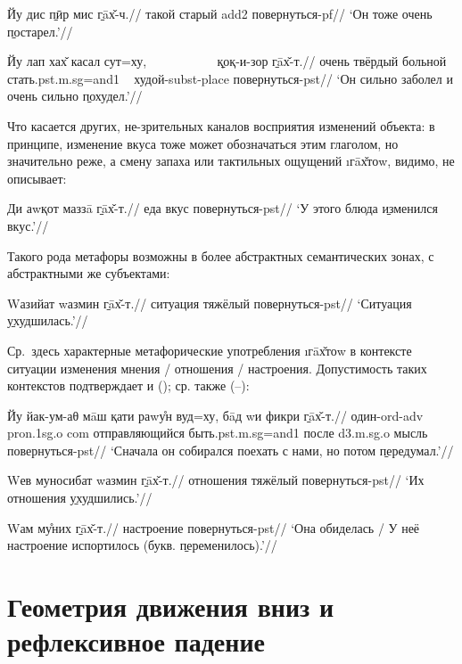 \begingl
\gla Йу дис \b{пӣр} мис \b{гāх̌-ч}.//
 такой старый {\sc add2} повернуться-{\sc pf}//
\glft ‘Он тоже очень \b{постарел}.’//
\endgl \xe

\begingl
\gla Йу лап хах̌ касал сут=ху, ~~~~~~~~~~ \b{қоқ-и-зор} \b{гāх̌-т}.//
 очень твёрдый больной стать.{\sc pst.m.sg=and1} ~ худой-{\sc subst-place} повернуться-{\sc pst}//
\glft ‘Он сильно заболел и очень сильно \b{похудел}.’//
\endgl \xe

Что касается других, не-зрительных каналов восприятия изменений объекта: в принципе, изменение вкуса тоже может обозначаться этим глаголом, но значительно реже, а смену запаха или тактильных ощущений \i{гāх̌тоw}, видимо, не описывает:

\begingl
\gla Ди аwқот маззā \b{гāх̌-т}.//
 еда вкус повернуться-{\sc pst}//
\glft ‘У этого блюда \b{изменился} вкус.’//
\endgl \xe

Такого рода метафоры возможны в более абстрактных семантических зонах, с абстрактными же субъектами:

\begingl
\gla Wазийат wазмин \b{гāх̌-т}.//
\glc ситуация тяжёлый повернуться-{\sc pst}//
\glft ‘Ситуация \b{ухудшилась}.’//
\endgl \xe

Ср.~здесь характерные метафорические употребления \i{гāх̌тоw} в контексте ситуации изменения мнения / отношения / настроения. Допустимость таких контекстов подтверждает и \parencite[387]{karamshoev1988} (); ср. также (–):

\begingl
\gla Йу йак-ум-аθ мāш қати раwу̊н вуд=ху, бāд wи фикри \b{гāх̌-т}.//
 один-{\sc ord-adv} {\sc pron.1sg.o} {\sc com} отправляющийся быть.{\sc pst.m.sg=and1} после {\sc d3.m.sg.o} мысль повернуться-{\sc pst}//
\glft ‘Сначала он собирался поехать с нами, но потом \b{передумал}.’//
\endgl \xe

\begingl
\gla Wев муносибат wазмин \b{гāх̌-т}.//
 отношения тяжёлый повернуться-{\sc pst}//
\glft ‘Их отношения \b{ухудшились}.’//
\endgl \xe

\begingl
\gla Wам му̊них \b{гāх̌-т}.//
 настроение повернуться-{\sc pst}//
\glft ‘Она обиделась / У неё настроение испортилось (букв. \b{переменилось}).’//
\endgl \xe

\section{Геометрия движения вниз и рефлексивное падение} \label{down-geometry}

